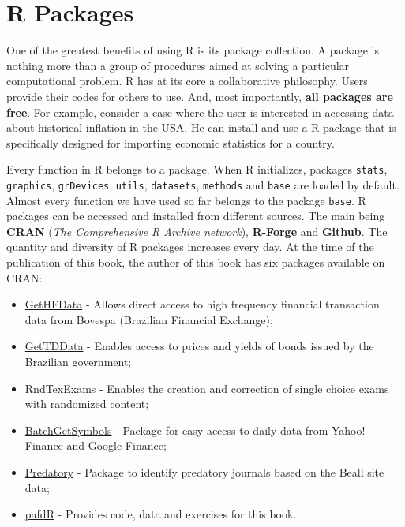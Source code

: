 \documentclass[11pt,]{book}
\begin{document}
\section{R Packages}\label{r-packages}

One of the greatest benefits of using R is its package collection. A
package is nothing more than a group of procedures aimed at solving a
particular computational problem. R has at its core a collaborative
philosophy. Users provide their codes for others to use. And, most
importantly, \textbf{all packages are free}. For example, consider a
case where the user is interested in accessing data about historical
inflation in the USA. He can install and use a R package that is
specifically designed for importing economic statistics for a country.

Every function in R belongs to a package. When R initializes, packages
\texttt{stats}, \texttt{graphics}, \texttt{grDevices}, \texttt{utils},
\texttt{datasets}, \texttt{methods} and \texttt{base} are loaded by
default. Almost every function we have used so far belongs to the
package \texttt{base}. R packages can be accessed and installed from
different sources. The main being \textbf{CRAN} (\emph{The Comprehensive
R Archive network}), \textbf{R-Forge} and \textbf{Github}. The quantity
and diversity of R packages increases every day. At the time of the
publication of this book, the author of this book has six packages
available on CRAN:   

\begin{itemize}
\item
  \href{https://CRAN.R-project.org/package=GetHFData}{GetHFData} -
  Allows direct access to high frequency financial transaction data from
  Bovespa (Brazilian Financial Exchange);
\item
  \href{https://CRAN.R-project.org/package=GetTDData}{GetTDData} -
  Enables access to prices and yields of bonds issued by the Brazilian
  government;
\item
  \href{https://CRAN.R-project.org/package=RndTexExams}{RndTexExams} -
  Enables the creation and correction of single choice exams with
  randomized content;
\item
  \href{https://CRAN.R-project.org/package=BatchGetSymbols}{BatchGetSymbols}
  - Package for easy access to daily data from Yahoo! Finance and Google
  Finance;
\item
  \href{https://CRAN.R-project.org/package=predatory}{Predatory} -
  Package to identify predatory journals based on the Beall site data;
\item
  \href{https://CRAN.R-project.org/package=pafdR}{pafdR} - Provides
  code, data and exercises for this book.
\end{itemize}
\end{document}
